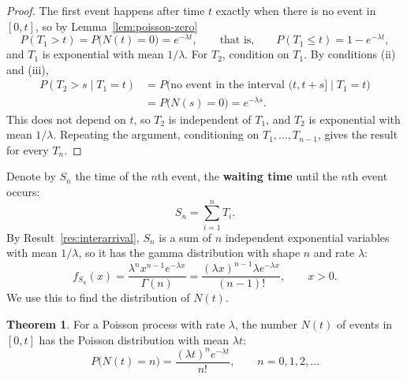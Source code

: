 \documentclass[11pt,a4paper]{article}
\theoremstyle{definition}
\newtheorem{thm}{Theorem}[subsection]
\begin{document}
\begin{proof}
The first event happens after time $t$ exactly when there is no event in $[0, t]$, so by Lemma~\ref{lem:poisson-zero}
\[
P(T_1 > t) = P\bigl(N(t) = 0\bigr) = e^{-\lambda t} , \qquad\text{that is,}\qquad P(T_1 \le t) = 1 - e^{-\lambda t} ,
\]
and $T_1$ is exponential with mean $1/\lambda$. For $T_2$, condition on $T_1$. By conditions (ii) and (iii),
\begin{align*}
P(T_2 > s \mid T_1 = t) &= P\bigl(\text{no event in the interval } (t, t + s] \mid T_1 = t\bigr) \\
&= P\bigl(N(s) = 0\bigr) = e^{-\lambda s} .
\end{align*}
This does not depend on $t$, so $T_2$ is independent of $T_1$, and $T_2$ is exponential with mean $1/\lambda$. Repeating the argument, conditioning on
$T_1, \dots, T_{n-1}$, gives the result for every $T_n$.
\end{proof}

Denote by $S_n$ the time of the $n$th event, the \textbf{waiting time} until the $n$th event occurs:
\[
S_n = \sum_{i=1}^nT_i .
\]
By Result~\ref{res:interarrival}, $S_n$ is a sum of $n$ independent exponential variables with mean $1/\lambda$, so it has the gamma distribution with
shape $n$ and rate $\lambda$:
\[
f_{S_n}(x) = \frac{\lambda^nx^{n-1}e^{-\lambda x}}{\Gamma(n)} = \frac{(\lambda x)^{n-1}\lambda e^{-\lambda x}}{(n - 1)!} , \qquad x > 0 .
\]
We use this to find the distribution of $N(t)$.

\begin{thm}\label{thm:poisson-count}
For a Poisson process with rate $\lambda$, the number $N(t)$ of events in $[0, t]$ has the Poisson distribution with mean $\lambda t$:
\[
P\bigl(N(t) = n\bigr) = \frac{(\lambda t)^ne^{-\lambda t}}{n!} , \qquad n = 0, 1, 2, \dots
\]
\end{thm}
\end{document}

